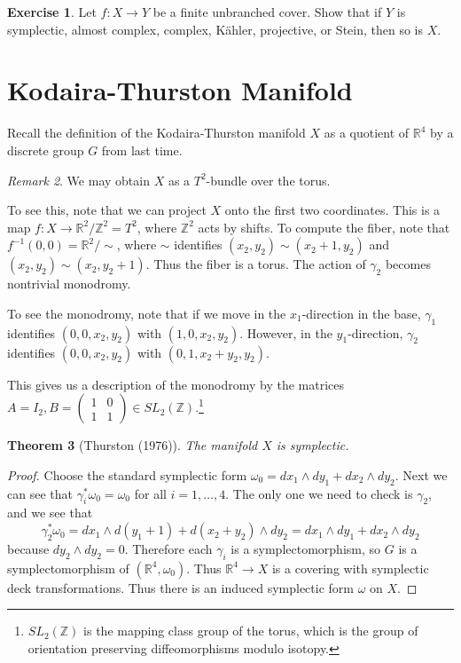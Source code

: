 \documentclass[leqno, openany]{memoir}
\newtheorem{thm}{Theorem}[chapter]
\theoremstyle{definition}
\newtheorem{exer}[thm]{Exercise}
\theoremstyle{remark}
\newtheorem{rmk}[thm]{Remark}
\theoremstyle{plain}
\theoremstyle{definition}
\theoremstyle{remark}
\newcommand{\R}{\mathbb{R}}
\newcommand{\Z}{\mathbb{Z}}
\begin{document}
\begin{exer}
    Let $f: X \to Y$ be a finite unbranched cover. Show that if $Y$ is symplectic, almost complex, complex, K\"ahler, projective, or Stein, then so is $X$.
\end{exer}

\section{Kodaira-Thurston Manifold}%
\label{sec:kodaira_thurston_manifold}

Recall the definition of the Kodaira-Thurston manifold $X$ as a quotient of $\R^4$ by a discrete group $G$ from last time.

\begin{rmk}
    We may obtain $X$ as a $T^2$-bundle over the torus.
\end{rmk}

To see this, note that we can project $X$ onto the first two coordinates. This is a map $f: X \to \R^2/\Z^2 = T^2$, where $\Z^2$ acts by shifts. To compute the fiber, note that $f^{-1}(0,0) = \R^2/\sim$, where $\sim$ identifies $(x_2, y_2) \sim (x_2 + 1, y_2)$ and $(x_2,y_2) \sim (x_2, y_2 + 1)$. Thus the fiber is a torus. The action of $\gamma_2$ becomes nontrivial monodromy.

To see the monodromy, note that if we move in the $x_1$-direction in the base, $\gamma_1$ identifies $(0,0,x_2,y_2)$ with $(1,0,x_2, y_2)$. However, in the $y_1$-direction, $\gamma_2$ identifies $(0,0,x_2, y_2)$ with $(0,1,x_2+y_2,y_2)$.

This gives us a description of the monodromy by the matrices $A = I_2, B = \begin{pmatrix}
    1 & 0 \\ 1 & 1
\end{pmatrix} \in SL_2(\Z)$.\footnote{$SL_2(\Z)$ is the mapping class group of the torus, which is the group of orientation preserving diffeomorphisms modulo isotopy.}

\begin{thm}[Thurston (1976)]
    The manifold $X$ is symplectic.
\end{thm}

\begin{proof}
    Choose the standard symplectic form $\omega_0 = dx_1 \wedge dy_1 + dx_2 \wedge dy_2$. Next we can see that $\gamma_i^*\omega_0 = \omega_0$ for all $i = 1, \ldots, 4$. The only one we need to check is $\gamma_2$, and we see that
    \[ \gamma_2^* \omega_0 = d x_1 \wedge d(y_1 + 1) + d(x_2 + y_2) \wedge dy_2 = dx_1 \wedge dy_1 + dx_2 \wedge dy_2 \]
    because $dy_2 \wedge dy_2 = 0$. Therefore each $\gamma_i$ is a symplectomorphism, so $G$ is a symplectomorphism of $(\R^4, \omega_0)$. Thus $\R^4 \to X$ is a covering with symplectic deck transformations. Thus there is an induced symplectic form $\omega$ on $X$.
\end{proof}
\end{document}
